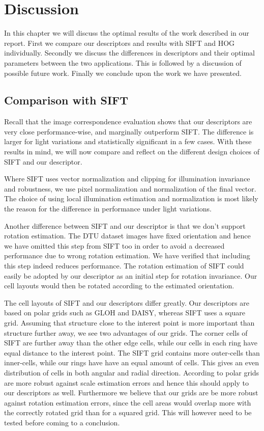 \documentclass[thesis.tex]{subfiles}
\begin{document}
\chapter{Discussion}

In this chapter we will discuss the optimal results of the work described in our report.
First we compare our descriptors and results with SIFT and HOG individually. Secondly we discuss the differences in descriptors and their optimal parameters between the two applications.
This is followed by a discussion of possible future work. Finally we conclude upon the work we have presented.

\section{Comparison with SIFT}
Recall that the image correspondence evaluation shows that our descriptors are very close performance-wise, and marginally outperform SIFT. The difference is larger for light variations and statistically significant in a few cases. With these results in mind, we will now compare and reflect on the different design choices of SIFT and our descriptor.

Where SIFT uses vector normalization and clipping for illumination invariance and robustness, we use pixel normalization and normalization of the final vector. The choice of using local illumination estimation and normalization is most likely the reason for the difference in performance under light variations.

Another difference between SIFT and our descriptor is that we don't support rotation estimation. The DTU dataset images have fixed orientation and hence we have omitted this step from SIFT too in order to avoid a decreased performance due to wrong rotation estimation. We have verified that including this step indeed reduces performance. The rotation estimation of SIFT could easily be adopted by our descriptor as an initial step for rotation invariance. Our cell layouts would then be rotated according to the estimated orientation.

The cell layouts of SIFT and our descriptors differ greatly. Our descriptors are based on polar grids such as GLOH and DAISY, whereas SIFT uses a square grid. Assuming that structure close to the interest point is more important than structure further away, we see two advantages of our grids. The corner cells of SIFT are further away than the other edge cells, while our cells in each ring have equal distance to the interest point. The SIFT grid contains more outer-cells than inner-cells, while our rings have have an equal amount of cells. This gives an even distribution of cells in both angular and radial direction. According to \citet{cui2009scale} polar grids are more robust against scale estimation errors and hence this should apply to our descriptors as well. Furthermore we believe that our grids are be more robust against rotation estimation errors, since the cell areas would overlap more with the correctly rotated grid than for a squared grid. This will however need to be tested before coming to a conclusion.
\end{document}
